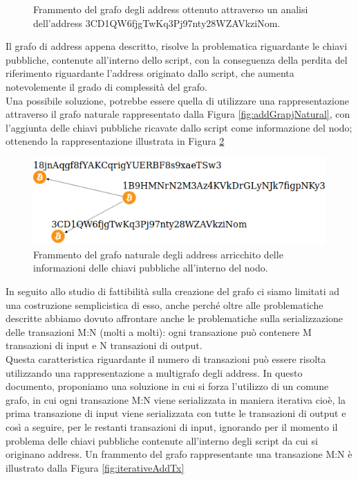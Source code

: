\begin{itemize}
\begin{figure}[H]
   \caption{Frammento del grafo degli address ottenuto attraverso un analisi dell'address 3CD1\-QW6fjg\-TwKq3Pj\-97nty28W\-ZAVkz\-iNom.\label{fig:addGraphAnalisis}}
   \end{figure}
   Il grafo di address appena descritto, risolve la problematica riguardante le chiavi pubbliche, contenute all'interno dello script, con la conseguenza della perdita del riferimento riguardante l'address originato dallo script, che aumenta notevolemente il grado di complessità del grafo.\\
   Una possibile soluzione, potrebbe essere quella di utilizzare una rappresentazione attraverso il grafo naturale rappresentato dalla Figura \ref{fig:addGrapjNatural}, con l'aggiunta delle chiavi pubbliche ricavate dallo script come informazione del nodo; ottenendo la rappresentazione illustrata in Figura \ref{fig:addGrapjNaturalPlus}
   \begin{figure}[H]
   \centering
   \includegraphics[scale=0.35]{images/exampleWithGraph/naturalAddressGrahScamTx.png}
   \caption{Frammento del grafo naturale degli address arricchito delle informazioni delle chiavi pubbliche all'interno del nodo.\label{fig:addGrapjNaturalPlus}}
   \end{figure}
 \end{itemize}

 In seguito allo studio di fattibilità sulla creazione del grafo ci siamo limitati ad una costruzione semplicistica di esso, anche perché oltre alle problematiche descritte abbiamo dovuto affrontare anche le problematiche sulla serializzazione delle transazioni M:N (molti a molti): ogni transazione può contenere M transazioni di input e N transazioni di output.\\
 Questa caratteristica riguardante il numero di transazioni può essere risolta utilizzando una rappresentazione a multigrafo degli address.
 In questo documento, proponiamo una soluzione in cui si forza l'utilizzo di un comune grafo, in cui ogni transazione M:N viene serializzata in maniera iterativa cioè, la prima transazione di input viene serializzata con tutte le transazioni di output e così a seguire, per le restanti transazioni di input, ignorando per il momento il problema delle chiavi pubbliche contenute all'interno degli script da cui si originano address.
 Un frammento del grafo rappresentante una transazione M:N è illustrato dalla Figura \ref{fig:iterativeAddTx}

